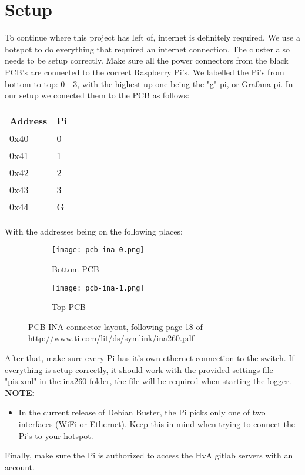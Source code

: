 \section{Setup}
To continue where this project has left of, internet is definitely required. We use a hotspot to do everything that required an internet connection.\newline
The cluster also needs to be setup correctly. Make sure all the power connectors from the black PCB's are connected to the correct Raspberry Pi's. We labelled the Pi's from bottom to top: 0 - 3, with the highest up one being the "g" pi, or Grafana pi. In our setup we conected them to the PCB as follows:
\begin{table}[h]
\centering
\begin{tabular}{|l|l|}
\hline
Address & Pi \\ \hline
0x40 & 0 \\ \hline
0x41 & 1 \\ \hline
0x42 & 2 \\ \hline
0x43 & 3 \\ \hline
0x44 & G \\ \hline
\end{tabular}
\end{table}
\newline
With the addresses being on the following places:
\begin{figure}[h]
	\centering
	\begin{subfigure}[b]{0.4\linewidth}
    		\texttt{[image: pcb-ina-0.png]}
    		\caption{Bottom PCB}
    	\end{subfigure}
    \begin{subfigure}[b]{0.4\linewidth}
    		\texttt{[image: pcb-ina-1.png]}
    		\caption{Top PCB}
    \end{subfigure}
    \caption{PCB INA connector layout, following page 18 of \url{http://www.ti.com/lit/ds/symlink/ina260.pdf}}
    \label{inapcb}
\end{figure}\newline
After that, make sure every Pi has it's own ethernet connection to the switch. If everything is setup correctly, it should work with the provided settings file "pis.xml" in the ina260 folder, the file will be required when starting the logger.\newline
\newline
\textbf{NOTE:}
\begin{itemize}
	\item In the current release of Debian Buster, the Pi picks only one of two interfaces (WiFi or Ethernet). Keep this in mind when trying to connect the Pi's to your hotspot.
\end{itemize}
Finally, make sure the Pi is authorized to access the HvA gitlab servers with an account.